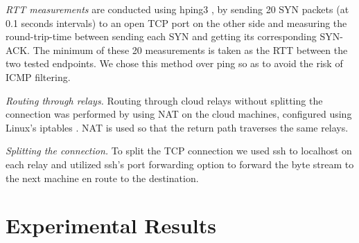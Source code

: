 \documentclass{hotnets17}
\newcommand{\mycomm}[3]{{\color{#2} \textbf{[#1: #3]}}}
\newcommand{\mycomm}[3]{}
\newcommand{\IK}[1]{\mycomm{IK}{blue}{#1}}
\newcommand{\AB}[1]{\mycomm{AB}{Orange}{#1}}
\newcommand{\U}[1]{\smallskip\noindent\textit{#1}} %
\begin{document}
\ifblind \else
\smallskip{} \textit{RTT measurements} are conducted using hping3 \cite{hping3}, by sending 20 SYN packets (at 0.1 seconds intervals) to an open TCP port on the other side and measuring the round-trip-time between sending each SYN and getting its corresponding SYN-ACK. The minimum of these 20 measurements is taken as the RTT between the two tested endpoints. We chose this method over ping so as to avoid the risk of ICMP filtering.

\U{Routing through relays.} Routing through cloud relays without splitting the connection was performed by using NAT on the cloud machines, configured using Linux's iptables \cite{iptables}. NAT is used so that the return path traverses the same relays.

\U{Splitting the connection.} To split the TCP connection we used ssh to localhost on each relay and utilized ssh's port forwarding option to forward the byte stream to the next machine en route to the destination.
\fi





\section{Experimental Results}
\end{document}
